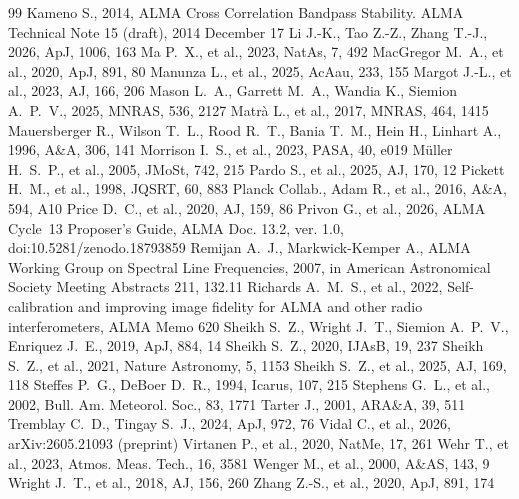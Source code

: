 \documentclass[twocolumn,twocolappendix,numberedappendix,appendixfloats]{openjournal}
\begin{document}
\begin{thebibliography}{99}
 Kameno S., 2014, ALMA Cross Correlation Bandpass Stability. ALMA Technical Note 15 (draft), 2014 December 17
 Li J.-K., Tao Z.-Z., Zhang T.-J., 2026, ApJ, 1006, 163
 Ma P.~X., et al., 2023, NatAs, 7, 492
 MacGregor M.~A., et al., 2020, ApJ, 891, 80
 Manunza L., et al., 2025, AcAau, 233, 155
 Margot J.-L., et al., 2023, AJ, 166, 206
 Mason L.~A., Garrett M.~A., Wandia K., Siemion A.~P.~V., 2025, MNRAS, 536, 2127
 Matrà L., et al., 2017, MNRAS, 464, 1415
 Mauersberger R., Wilson T.~L., Rood R.~T., Bania T.~M., Hein H., Linhart A., 1996, A\&A, 306, 141
 Morrison I.~S., et al., 2023, PASA, 40, e019
 M\"uller H.~S.~P., et al., 2005, JMoSt, 742, 215
 Pardo S., et al., 2025, AJ, 170, 12
 Pickett H.~M., et al., 1998, JQSRT, 60, 883
 Planck Collab., Adam R., et al., 2016, A\&A, 594, A10
 Price D.~C., et al., 2020, AJ, 159, 86
 Privon G., et al., 2026, ALMA Cycle~13 Proposer's Guide, ALMA Doc. 13.2, ver. 1.0, doi:10.5281/zenodo.18793859
 Remijan A.~J., Markwick-Kemper A., ALMA Working Group on Spectral Line Frequencies, 2007, in American Astronomical Society Meeting Abstracts 211, 132.11
 Richards A.~M.~S., et al., 2022, Self-calibration and improving image fidelity for ALMA and other radio interferometers, ALMA Memo 620
 Sheikh S.~Z., Wright J.~T., Siemion A.~P.~V., Enriquez J.~E., 2019, ApJ, 884, 14
 Sheikh S.~Z., 2020, IJAsB, 19, 237
 Sheikh S.~Z., et al., 2021, Nature Astronomy, 5, 1153
 Sheikh S.~Z., et al., 2025, AJ, 169, 118
 Steffes P.~G., DeBoer D.~R., 1994, Icarus, 107, 215
 Stephens G.~L., et al., 2002, Bull. Am. Meteorol. Soc., 83, 1771
 Tarter J., 2001, ARA\&A, 39, 511
 Tremblay C.~D., Tingay S.~J., 2024, ApJ, 972, 76
 Vidal C., et al., 2026, arXiv:2605.21093 (preprint)
 Virtanen P., et al., 2020, NatMe, 17, 261
 Wehr T., et al., 2023, Atmos. Meas. Tech., 16, 3581
 Wenger M., et al., 2000, A\&AS, 143, 9
 Wright J.~T., et al., 2018, AJ, 156, 260
 Zhang Z.-S., et al., 2020, ApJ, 891, 174
\end{thebibliography}
\end{document}
